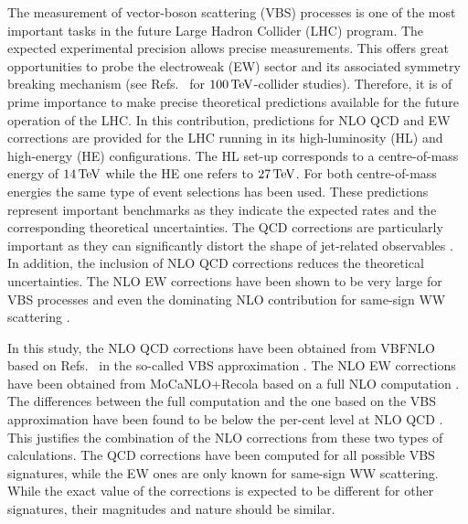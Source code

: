 \documentclass[11pt,epsf]{article}
\begin{document}
The measurement of vector-boson scattering (VBS) processes is one of
the most important tasks in the future Large Hadron Collider (LHC) program.
The expected experimental precision allows precise measurements.
This offers great opportunities to probe the electroweak (EW) sector and its associated symmetry breaking mechanism
(see Refs.~\cite{Mangano:2016jyj,Goncalves:2017gzy,Jager:2017owh} for $100\,\text{TeV}$-collider studies).
Therefore, it is of prime importance to make precise theoretical
predictions available for the future operation of the LHC.
In this contribution, predictions for NLO QCD and EW corrections are provided for the LHC running in its high-luminosity (HL) and high-energy (HE) configurations.
The HL set-up corresponds to a centre-of-mass energy of $14\,\text{TeV}$ while
the HE one refers to $27\,\text{TeV}$.
For both centre-of-mass energies the same type of event selections has been used.
These predictions represent important benchmarks as they indicate the expected rates and the corresponding theoretical uncertainties.
The QCD corrections are particularly important as they can significantly distort the shape of jet-related observables \cite{Jager:2006zc,Jager:2006cp,Bozzi:2007ur,Jager:2009xx,Jager:2011ms,Denner:2012dz,Rauch:2016pai,Biedermann:2017bss,Ballestrero:2018anz}.
In addition, the inclusion of NLO QCD corrections reduces the theoretical uncertainties.
The NLO EW corrections have been shown to be very large for VBS processes \cite{Biedermann:2016yds} and even the dominating NLO contribution for same-sign WW scattering \cite{Biedermann:2017bss}.

In this study, the NLO QCD corrections have been obtained from VBFNLO based on Refs.~\cite{Arnold:2008rz, Arnold:2011wj, Baglio:2014uba} in the so-called VBS approximation \cite{Oleari:2003tc,Denner:2012dz,Ballestrero:2018anz}.
The NLO EW corrections have been obtained from {\sc MoCaNLO+Recola}
\cite{Bendavid:2018nar,Actis:2016mpe,Actis:2016mpe} based on a
full NLO computation \cite{Biedermann:2017bss}.
The differences between the full computation and the one based on the
VBS approximation have been found to be below the per-cent level at
NLO QCD \cite{Ballestrero:2018anz}.
This justifies the combination of the NLO corrections from these two types of calculations.
The QCD corrections have been computed for all possible VBS signatures, while the EW ones are only known for same-sign WW scattering.
While the exact value of the corrections is expected to be different
for other signatures, their magnitudes and nature should be similar.
\end{document}
